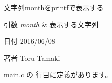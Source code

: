 文字列monthをprintfで表示する 


\begin{DoxyParams}{引数}
{\em month} & 表示する文字列 \\
\hline
\end{DoxyParams}
\begin{DoxyDate}{日付}
2016/06/08 
\end{DoxyDate}
\begin{DoxyAuthor}{著者}
Toru Tamaki 
\end{DoxyAuthor}


 \hyperlink{main_8c_source}{main.\-c} の  行目に定義があります。


